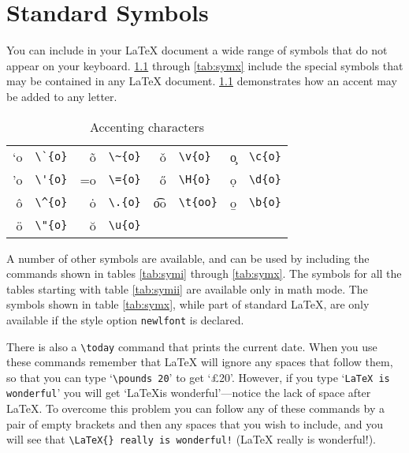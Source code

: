 \chapter{Standard Symbols}
 
You can include in your \LaTeX{} document a wide range of symbols
that do not appear on your keyboard.
\ref{tab:accent} through \ref{tab:symx}
include the special symbols that may be contained
in any \LaTeX{} document.
\ref{tab:accent} demonstrates how an accent may be added to any
letter.
 
\begin{table}
\centering
\caption{Accenting characters}\label{tab:accent}
\vspace{\baselineskip}
\tablerule
\begin{tabular}{rlrlrlrl}
\a`{o} &\verb|\`{o}|&  \~{o} &\verb|\~{o}|&  \v{o} &\verb|\v{o}|&
\c{o}  &\verb|\c{o}|\\
\a'{o} &\verb|\'{o}|&  \a={o}&\verb|\={o}|&  \H{o} &\verb|\H{o}|&
\d{o}  &\verb|\d{o}|\\
\^{o}  &\verb|\^{o}|&  \.{o} &\verb|\.{o}|&  \t{oo}&\verb|\t{oo}|&
\b{o}  &\verb|\b{o}|\\
\"{o}  &\verb|\"{o}|&  \u{o} &\verb|\u{o}|&&&\\
\end{tabular}
\tablerule
\end{table}
 
A number of other symbols are available, and can be used by including the
commands shown in tables \ref{tab:symi} through \ref{tab:symx}.
The symbols for all the tables starting with table \ref{tab:symii} are
available only in math mode.
The symbols shown in table \ref{tab:symx}, while part of standard
\LaTeX{}, are only available if the style option \verb|newlfont| is
declared.
 
There is also a \verb|\today| command that prints the current date.
When you use these commands remember that \LaTeX{} will ignore any
spaces that follow them, so that you can type `\verb|\pounds 20|'
to get `\pounds 20'.
However, if you type `\verb|LaTeX is wonderful|' you will get `\LaTeX is
wonderful'---notice the lack of space after \LaTeX.
To overcome this problem you can follow any of these commands by a
pair of empty brackets and then any spaces that you wish to include,
and you will see that
\verb|\LaTeX{} really is wonderful!| (\LaTeX{} really is wonderful!).
 
